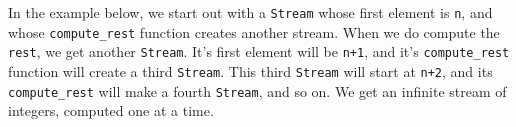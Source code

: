 In the example below, we start out with a \lstinline$Stream$ whose first
element is \lstinline$n$, and whose \lstinline$compute_rest$ function creates
another stream.
When we do compute the \lstinline$rest$, we get another \lstinline$Stream$.
It's first element will be \lstinline$n+1$, and it's \lstinline$compute_rest$
function will create a third \lstinline$Stream$.
This third \lstinline$Stream$ will start at \lstinline$n+2$, and its
\lstinline$compute_rest$ will make a fourth \lstinline$Stream$, and so on.
We get an infinite stream of integers, computed one at a time.
